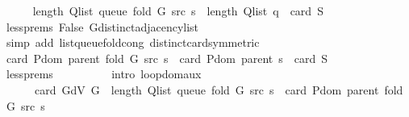 \begin{isabellebody}
\isanewline
\ \ \ \ \isamarkupfalse%
\ {\isachardoublequoteopen}length\ {\isacharparenleft}{\kern0pt}Q{\isacharunderscore}{\kern0pt}list\ {\isacharparenleft}{\kern0pt}queue\ {\isacharparenleft}{\kern0pt}fold\ G\ src\ s{\isacharparenright}{\kern0pt}{\isacharparenright}{\kern0pt}{\isacharparenright}{\kern0pt}\ {\isacharequal}{\kern0pt}\ length\ {\isacharparenleft}{\kern0pt}Q{\isacharunderscore}{\kern0pt}list\ {\isacharquery}{\kern0pt}q{\isacharparenright}{\kern0pt}\ {\isacharplus}{\kern0pt}\ card\ {\isacharquery}{\kern0pt}S{\isachardoublequoteclose}\isanewline
\ \ \ \ \ \ \isamarkupfalse%
\ less{\isachardot}{\kern0pt}prems{\isacharparenleft}{\kern0pt}{}{\isacharminus}{\kern0pt}{}{\isacharparenright}{\kern0pt}\ False\ G{\isachardot}{\kern0pt}distinct{\isacharunderscore}{\kern0pt}adjacency{\isacharunderscore}{\kern0pt}list\isanewline
\ \ \ \ \ \ \isamarkupfalse%
\ {\isacharparenleft}{\kern0pt}simp\ add{\isacharcolon}{\kern0pt}\ list{\isacharunderscore}{\kern0pt}queue{\isacharunderscore}{\kern0pt}fold{\isacharunderscore}{\kern0pt}cong{\isacharunderscore}{\kern0pt}{}\ distinct{\isacharunderscore}{\kern0pt}card{\isacharbrackleft}{\kern0pt}symmetric{\isacharbrackright}{\kern0pt}{\isacharparenright}{\kern0pt}\isanewline
\ \ \ \ \isamarkupfalse%
\ \isamarkupfalse%
\ {\isachardoublequoteopen}card\ {\isacharparenleft}{\kern0pt}P{\isachardot}{\kern0pt}dom\ {\isacharparenleft}{\kern0pt}parent\ {\isacharparenleft}{\kern0pt}fold\ G\ src\ s{\isacharparenright}{\kern0pt}{\isacharparenright}{\kern0pt}{\isacharparenright}{\kern0pt}\ {\isacharequal}{\kern0pt}\ card\ {\isacharparenleft}{\kern0pt}P{\isachardot}{\kern0pt}dom\ {\isacharparenleft}{\kern0pt}parent\ s{\isacharparenright}{\kern0pt}{\isacharparenright}{\kern0pt}\ {\isacharplus}{\kern0pt}\ card\ {\isacharquery}{\kern0pt}S{\isachardoublequoteclose}\isanewline
\ \ \ \ \ \ \isamarkupfalse%
\ less{\isachardot}{\kern0pt}prems{\isacharparenleft}{\kern0pt}{}{\isacharcomma}{\kern0pt}\ {}{\isacharcomma}{\kern0pt}\ {}{\isacharparenright}{\kern0pt}\isanewline
\ \ \ \ \ \ \isamarkupfalse%
\ {\isacharparenleft}{\kern0pt}intro\ loop{\isacharunderscore}{\kern0pt}dom{\isacharunderscore}{\kern0pt}aux{\isacharparenright}{\kern0pt}\isanewline
\ \ \ \ \isamarkupfalse%
\ \isamarkupfalse%
\isanewline
\ \ \ \ \ \ {\isachardoublequoteopen}card\ {\isacharparenleft}{\kern0pt}G{\isachardot}{\kern0pt}dV\ G{\isacharparenright}{\kern0pt}\ {\isacharplus}{\kern0pt}\ length\ {\isacharparenleft}{\kern0pt}Q{\isacharunderscore}{\kern0pt}list\ {\isacharparenleft}{\kern0pt}queue\ {\isacharparenleft}{\kern0pt}fold\ G\ src\ s{\isacharparenright}{\kern0pt}{\isacharparenright}{\kern0pt}{\isacharparenright}{\kern0pt}\ {\isacharminus}{\kern0pt}\ card\ {\isacharparenleft}{\kern0pt}P{\isachardot}{\kern0pt}dom\ {\isacharparenleft}{\kern0pt}parent\ {\isacharparenleft}{\kern0pt}fold\ G\ src\ s{\isacharparenright}{\kern0pt}{\isacharparenright}{\kern0pt}{\isacharparenright}{\kern0pt}\ {\isacharequal}{\kern0pt}\isanewline

\end{isabellebody}
